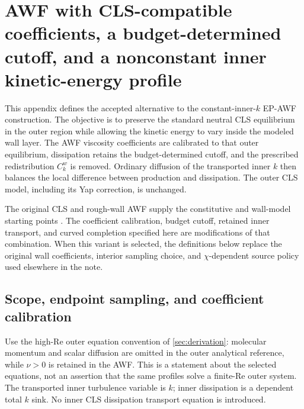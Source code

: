 %   

\section{AWF with CLS-compatible coefficients, a budget-determined cutoff,
and a nonconstant inner kinetic-energy profile}
\label{app:accepted-awf}

This appendix defines the accepted alternative to the constant-inner-$k$
EP-AWF construction. The objective is to preserve the standard neutral
CLS equilibrium in the outer region while allowing the kinetic energy
to vary inside the modeled wall layer. The AWF viscosity coefficients
are calibrated to that outer equilibrium, dissipation retains the
budget-determined cutoff, and the prescribed redistribution $C_k^w$
is removed. Ordinary diffusion of the transported inner $k$ then
balances the local difference between production and dissipation.
The outer CLS model, including its Yap correction, is unchanged.

The original CLS and rough-wall AWF supply the constitutive and
wall-model starting points \cite{CLS1996,SCI2006}. The coefficient
calibration, budget cutoff, retained inner transport, and curved
completion specified here are modifications of that combination.
When this variant is selected, the definitions below replace the
original wall coefficients, interior sampling choice, and
$\chi$-dependent source policy used elsewhere in the note.

\subsection{Scope, endpoint sampling, and coefficient calibration}
\label{app:accepted-awf-coefficients}

Use the high-Re outer equation convention of
\cref{sec:derivation}: molecular momentum and scalar diffusion are
omitted in the outer analytical reference, while $\nu>0$ is retained
in the AWF. This is a statement about the selected equations, not an
assertion that the same profiles solve a finite-Re outer system.
The transported inner turbulence variable is $k$; inner
dissipation is a dependent total $k$ sink. No inner CLS dissipation
transport equation is introduced.


